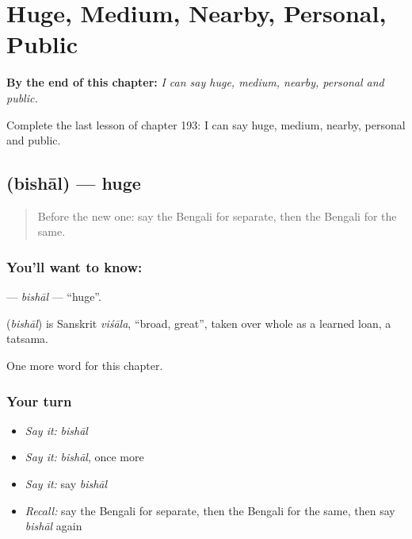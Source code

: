 
\chapter{Huge, Medium, Nearby, Personal, Public}
\label{ch:bn-huge-medium-nearby-personal-public}

\begin{chapteropening}
\textbf{By the end of this chapter:} \emph{I can say huge, medium, nearby, personal and public.}

Complete the last lesson of chapter 193: I can say huge, medium, nearby, personal and public.
\end{chapteropening}

\section[\texorpdfstring{\bn{বিশাল} (bishāl)}{বিশাল (bishāl)}]{ (bishāl) — huge}

\label{lesson:BN-C193-bishal}



\begin{quote}
Before the new one: say the Bengali for separate, then the Bengali for the same.
\end{quote}

\subsection*{You'll want to know: }
\textbf{} — \emph{bishāl} — \textquotedblleft{}huge\textquotedblright{}.

\begin{cousinweb}
\textbf{} (\emph{bishāl}) is Sanskrit \emph{viśāla}, \textquotedblleft{}broad, great\textquotedblright{}, taken over whole as a learned loan, a tatsama.
\end{cousinweb}

\begin{grammarlens}[title={What you've built}]
One more word for this chapter.
\end{grammarlens}

\subsection*{Your turn}
\begin{itemize}
\raggedright
  \item \emph{Say it:} \emph{bishāl}
  \item \emph{Say it:} \emph{bishāl}, once more
  \item \emph{Say it:} say \emph{bishāl}
  \item \emph{Recall:} say the Bengali for separate, then the Bengali for the same, then say \emph{bishāl} again
\end{itemize}

